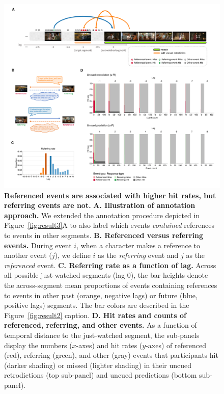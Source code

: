 \documentclass[10pt]{article}
\begin{document}
\begin{figure}[tp]
  \centering
  \includegraphics[width=\textwidth]{results5}
  \caption{\textbf{Referenced events are associated with higher hit rates, but referring events are not.}  \textbf{A. Illustration of annotation approach.}  We extended the annotation procedure depicted in Figure~\ref{fig:result3}A to also label which events \textit{contained} references to events in other segments.  \textbf{B. Referenced versus referring events.}  During event $i$, when a character makes a reference to another event ($j$), we define $i$ as the \textit{referring} event and $j$ as the \textit{referenced} event.  \textbf{C.  Referring rate as a function of lag.}  Across all possible just-watched segments (lag 0), the bar heights denote the across-segment mean proportions of events containing references to events in other past (orange, negative lags) or future (blue, positive lags) segments.  The bar colors are described in the Figure~\ref{fig:result2} caption.  \textbf{D. Hit rates and counts of referenced, referring, and other events.}  As a function of temporal distance to the just-watched segment, the sub-panels display the numbers ($x$-axes) and hit rates ($y$-axes) of referenced (red), referring (green), and other (gray) events that participants hit (darker shading) or missed (lighter shading) in their uncued retrodictions (top sub-panel) and uncued predictions (bottom sub-panel).}
  \label{fig:result5}
\end{figure}
\end{document}
